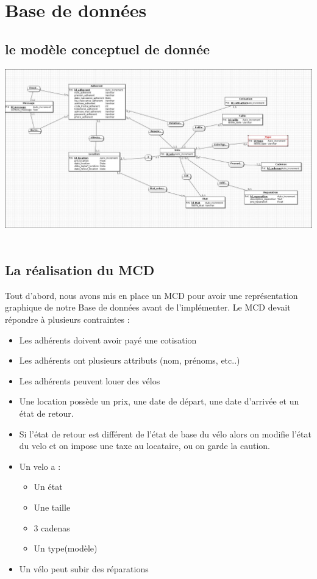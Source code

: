 \documentclass[11pt,a4paper,titlepage]{report}
\begin{document}
\chapter{Base de données}
\section{le modèle conceptuel de donnée}
\begin{center}
\includegraphics[width=1\textwidth]{MCD.jpg}~
\end{center}

\section{La réalisation du MCD}

Tout d'abord, nous avons mis en place un MCD pour avoir une représentation graphique de notre Base de données avant de l'implémenter.
Le MCD devait répondre à plusieurs contraintes :
\begin{itemize}
\item Les adhérents doivent avoir payé une cotisation
\item Les adhérents ont plusieurs attributs (nom, prénoms, etc..)
\item Les adhérents peuvent louer des vélos 
\item Une location possède un prix, une date de départ, une date d'arrivée et un état de retour.
\item Si l'état de retour est différent de l'état de base du vélo alors on modifie l'état du velo et on impose une taxe au locataire, ou on garde la caution.
\item Un velo a : 
\begin{itemize}
\item Un état
\item Une taille
\item 3 cadenas
\item Un type(modèle)
\end{itemize}
\item Un vélo peut subir des réparations
\end{itemize}
\end{document}
